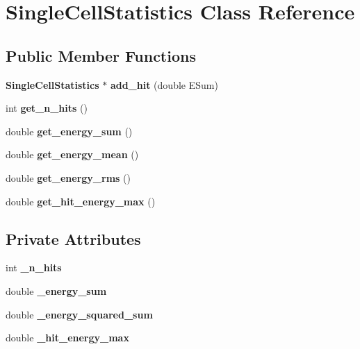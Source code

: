 \section{Single\-Cell\-Statistics Class Reference}
\label{classSingleCellStatistics}
\subsection*{Public Member Functions}
\begin{DoxyCompactItemize}
\item 
{\bf Single\-Cell\-Statistics} $\ast$ {\bfseries add\-\_\-hit} (double E\-Sum)\label{classSingleCellStatistics_a6a56d2dc810b72a4e5b4ded0422f8199}

\item 
int {\bfseries get\-\_\-n\-\_\-hits} ()\label{classSingleCellStatistics_aba90a0ea0bee6c636e3b369bd4338b06}

\item 
double {\bfseries get\-\_\-energy\-\_\-sum} ()\label{classSingleCellStatistics_aff5d2589b7c310995b2866e22f1def7e}

\item 
double {\bfseries get\-\_\-energy\-\_\-mean} ()\label{classSingleCellStatistics_ac921eb395cba1336b676ada1c9d15772}

\item 
double {\bfseries get\-\_\-energy\-\_\-rms} ()\label{classSingleCellStatistics_a7a72f85e2a683197655dc1bc1bea68d2}

\item 
double {\bfseries get\-\_\-hit\-\_\-energy\-\_\-max} ()\label{classSingleCellStatistics_aba089759ba105f50be7a4f21902f318f}

\end{DoxyCompactItemize}
\subsection*{Private Attributes}
\begin{DoxyCompactItemize}
\item 
int {\bfseries \-\_\-n\-\_\-hits}\label{classSingleCellStatistics_a518a9edb2a31a08301e08adaf9a8b41a}

\item 
double {\bfseries \-\_\-energy\-\_\-sum}\label{classSingleCellStatistics_a3a38fb073934aef88f90bf0a2257f235}

\item 
double {\bfseries \-\_\-energy\-\_\-squared\-\_\-sum}\label{classSingleCellStatistics_aeb92f74c92dae3392d08c160a5dbe252}

\item 
double {\bfseries \-\_\-hit\-\_\-energy\-\_\-max}\label{classSingleCellStatistics_a3bd8c04ddf2ce3aa47196220480c3a5a}

\end{DoxyCompactItemize}


